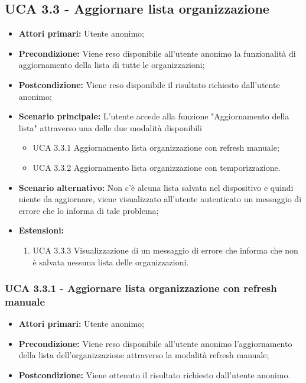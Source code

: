 \subsection{UCA 3.3 - Aggiornare lista organizzazione}%
\begin{itemize} 
	\item \textbf{Attori primari:} Utente anonimo;
	\item \textbf{Precondizione:} Viene reso disponibile all’utente anonimo la funzionalità di aggiornamento della lista di tutte le organizzazioni;
	\item \textbf{Postcondizione:} Viene reso disponibile il risultato richiesto dall’utente anonimo;
	\item \textbf{Scenario principale:}  L’utente accede alla funzione "Aggiornamento della lista" attraverso una delle due modalità disponibili
	\begin{itemize}
		\item UCA 3.3.1 Aggiornamento lista organizzazione con refresh manuale;
		\item UCA 3.3.2 Aggiornamento lista organizzazione con temporizzazione.
	\end{itemize}
	\item \textbf{Scenario alternativo:} Non c'è alcuna lista salvata nel dispositivo e quindi niente da aggiornare, viene visualizzato all’utente autenticato un messaggio di errore che lo informa di tale problema;
	\item \textbf{Estensioni:}
	\begin{enumerate}
		\item UCA 3.3.3 Visualizzazione di un messaggio di errore che informa che non è salvata nessuna lista delle organizzazioni.
	\end{enumerate}
\end{itemize}

\subsubsection{UCA 3.3.1 - Aggiornare lista organizzazione con refresh manuale}%
\begin{itemize}
	\item \textbf{Attori primari:} Utente anonimo;
	\item \textbf{Precondizione:} Viene reso disponibile all’utente anonimo l’aggiornamento della lista dell’organizzazione attraverso la modalità refresh manuale;
	\item \textbf{Postcondizione:} Viene ottenuto il risultato richiesto dall’utente anonimo.
	
\end{itemize}

